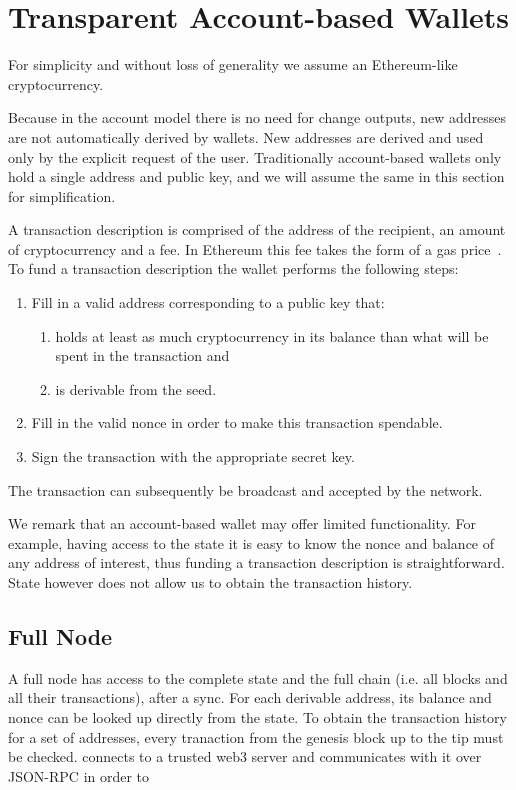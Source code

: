 \section{Transparent Account-based Wallets}
\label{transparent-account}

For simplicity and without loss of generality we assume an Ethereum-like cryptocurrency.

Because in the account model there is no need for change outputs, new addresses are not automatically derived by wallets. New addresses are derived and used only by the explicit request of the user. Traditionally account-based wallets only hold a single address and public key, and we will assume the same in this section for simplification.

A transaction description is comprised of the address of the recipient, an amount of cryptocurrency and a fee. In Ethereum this fee takes the form of a gas price~\cite{wood2014ethereum}.
To fund a transaction description the wallet performs the following steps:

\begin{enumerate}
    \item Fill in a valid address corresponding to a public key that:
    \begin{enumerate}
        \item holds at least as much cryptocurrency in its balance than what will be spent in the transaction and
        \item is derivable from the seed.
    \end{enumerate}
    \item Fill in the valid nonce in order to make this transaction spendable.
    \item Sign the transaction with the appropriate secret key.
\end{enumerate}

The transaction can subsequently be broadcast and accepted by the network.

We remark that an account-based wallet may offer limited functionality. For example, having access to the state it is easy to know the nonce and balance of any address of interest, thus funding a transaction description is straightforward. State however does not allow us to obtain the transaction history.

\subsection{Full Node}
A full node has access to the complete state and the full chain (i.e. all blocks and all their transactions), after a sync. For each derivable address, its balance and nonce can be looked up directly from the state. To obtain the transaction history for a set of addresses, every tranaction from the genesis block up to the tip must be checked.
connects to a trusted web3 server and communicates with it over JSON-RPC in order to
